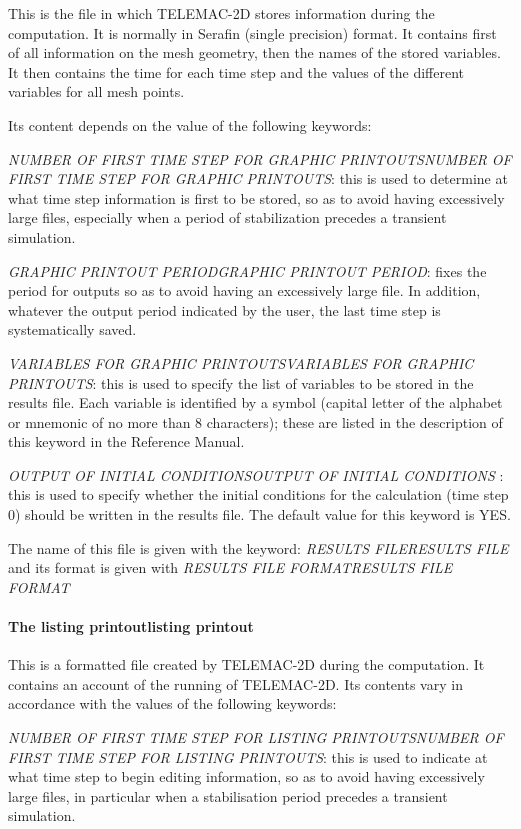 \documentclass{article} %
\begin{document}
 This is the file in which TELEMAC-2D stores information during the computation. It is normally in Serafin (single precision) format. It contains first of all information on the mesh geometry, then the names of the stored variables. It then contains the time for each time step and the values of the different variables for all mesh points.

 Its content depends on the value of the following keywords:

 \textit{NUMBER OF FIRST TIME STEP FOR GRAPHIC PRINTOUTSNUMBER OF FIRST TIME STEP FOR GRAPHIC PRINTOUTS}: this is used to determine at what time step information is first to be stored, so as to avoid having excessively large files, especially when a period of stabilization precedes a transient simulation.

 \textit{GRAPHIC PRINTOUT PERIODGRAPHIC PRINTOUT PERIOD}: fixes the period for outputs so as to avoid having an excessively large file. In addition, whatever the output period indicated by the user, the last time step is systematically saved.

 \textit{VARIABLES FOR GRAPHIC PRINTOUTSVARIABLES FOR GRAPHIC PRINTOUTS}: this is used to specify the list of variables to be stored in the results file. Each variable is identified by a symbol (capital letter of the alphabet or mnemonic of no more than 8 characters); these are listed in the description of this keyword in the Reference Manual.

 \textit{OUTPUT OF INITIAL CONDITIONSOUTPUT OF INITIAL CONDITIONS} : this is used to specify whether the initial conditions for the calculation (time step 0) should be written in the results file. The default value for this keyword is YES.

 The name of this file is given with the keyword: \textit{RESULTS FILERESULTS FILE} and its format is given with \textit{RESULTS FILE FORMATRESULTS FILE FORMAT}


\paragraph{ The listing printoutlisting printout}

 This is a formatted file created by TELEMAC-2D during the computation. It contains an account of the running of TELEMAC-2D. Its contents vary in accordance with the values of the following keywords:

 \textit{NUMBER OF FIRST TIME STEP FOR LISTING PRINTOUTSNUMBER OF FIRST TIME STEP FOR LISTING PRINTOUTS}: this is used to indicate at what time step to begin editing information, so as to avoid having excessively large files, in particular when a stabilisation period precedes a transient simulation.
\end{document}
